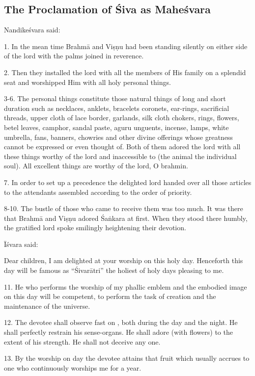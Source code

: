 \subsection{The Proclamation of Śiva as Maheśvara}

Nandikeśvara said:

1. In the mean time Brahmā and Viṣṇu had been standing silently on either side
of the lord with the palms joined in reverence.

2. Then they installed the lord with all the members of His family on a splendid
seat and worshipped Him with all holy personal things.

3-6. The personal things constitute those natural things of long and short
duration such as necklaces, anklets, bracelets coronets, ear-rings, sacrificial
threads, upper cloth of lace border, garlands, silk cloth chokers, rings,
flowers, betel leaves, camphor, sandal paste, aguru unguents, incense, lamps,
white umbrella, fans, banners, chowries and other divine offerings whose
greatness cannot be expressed or even thought of. Both of them adored the lord
with all these things worthy of the lord and inaccessible to 
(the animal \ie the individual soul). All excellent things are worthy of
the lord, O brahmin.

7. In order to set up a precedence the delighted lord handed over all those
articles to the attendants assembled according to the order of priority.

8-10. The bustle of those who came to receive them was too much. It was there
that Brahmā and Viṣṇu adored Śaṅkara at first. When they stood there humbly,
the gratified lord spoke smilingly heightening their devotion.

Īśvara said:

Dear children, I am delighted at your worship on this holy day. Henceforth this
day will be famous as “Śivarātri” the holiest of holy days pleasing to me.

11. He who performs the worship of my phallic emblem and the embodied image on
this day will be competent, to perform the task of creation and the maintenance
\etc of the universe.

12. The devotee shall observe fast on , both during the day and
the night. He shall perfectly restrain his sense-organs. He shall adore (with
flowers) to the extent of his strength. He shall not deceive any one.

13. By the worship on  day the devotee attains that fruit which
usually accrues to one who continuously worships me for a year.


